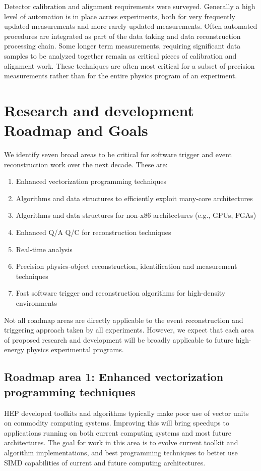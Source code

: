 Detector calibration and alignment requirements were surveyed. Generally a high level of automation is in place across experiments, both for very frequently updated measurements and more rarely updated measurements. Often automated procedures are integrated as part of the data taking and data reconstruction processing chain. Some longer term measurements, requiring significant data samples to be analyzed together remain as critical pieces of calibration and alignment work. These techniques are often most critical for a subset of precision measurements rather than for the entire physics program of an experiment.

\section{Research and development Roadmap and Goals}  

We identify seven broad areas to be critical for software trigger and event reconstruction work over the next decade. These are:
\begin{enumerate}
\item
Enhanced vectorization programming techniques
\item
Algorithms and data structures to efficiently exploit many-core architectures
\item
Algorithms and data structures for non-x86 architectures (e.g., GPUs, FGAs)
\item
Enhanced Q/A Q/C for reconstruction techniques
\item
Real-time analysis
\item
Precision physics-object reconstruction, identification and measurement techniques
\item
Fast software trigger and reconstruction algorithms for high-density environments
\end{enumerate}
Not all roadmap areas are directly applicable to the event reconstruction and triggering approach taken by all experiments. However, we expect that each area of proposed research and development will be broadly applicable to future high-energy physics experimental programs.

\subsection{Roadmap area 1: Enhanced vectorization programming techniques} 

HEP developed toolkits and algorithms typically make poor use of vector units on commodity computing systems. Improving this will bring speedups to applications running on both current computing systems and most future architectures. The goal for work in this area is to evolve current toolkit and algorithm implementations, and best programming techniques to better use SIMD capabilities of current and future computing architectures.

